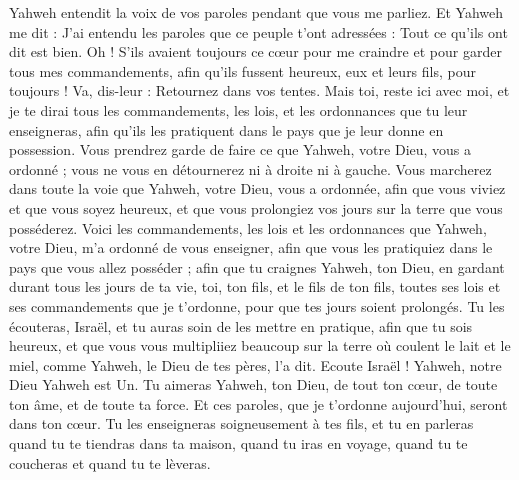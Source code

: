 \begin{multicols}{2}
Yahweh entendit la voix de vos paroles pendant que vous me parliez. Et Yahweh me dit : J'ai entendu les paroles que ce peuple t'ont adressées : Tout ce qu’ils ont dit est bien.
Oh ! S’ils avaient toujours ce cœur pour me craindre et pour garder tous mes commandements, afin qu'ils fussent heureux, eux et leurs fils, pour toujours !
Va, dis-leur : Retournez dans vos tentes.
Mais toi, reste ici avec moi, et je te dirai tous les commandements, les lois, et les ordonnances que tu leur enseigneras, afin qu'ils les pratiquent dans le pays que je leur donne en possession.
Vous prendrez garde de faire ce que Yahweh, votre Dieu, vous a ordonné ; vous ne vous en détournerez ni à droite ni à gauche.
Vous marcherez dans toute la voie que Yahweh, votre Dieu, vous a ordonnée, afin que vous viviez et que vous soyez heureux, et que vous prolongiez vos jours sur la terre que vous posséderez.
\VerseOne{}Voici les commandements, les lois et les ordonnances que Yahweh, votre Dieu, m'a ordonné de vous enseigner, afin que vous les pratiquiez dans le pays que vous allez posséder ;
afin que tu craignes Yahweh, ton Dieu, en gardant durant tous les jours de ta vie, toi, ton fils, et le fils de ton fils, toutes ses lois et ses commandements que je t’ordonne, pour que tes jours soient prolongés.
Tu les écouteras, Israël, et tu auras soin de les mettre en pratique, afin que tu sois heureux, et que vous vous multipliiez beaucoup sur la terre où coulent le lait et le miel, comme Yahweh, le Dieu de tes pères, l'a dit.
Ecoute Israël ! Yahweh, notre Dieu Yahweh est Un.
Tu aimeras Yahweh, ton Dieu, de tout ton cœur, de toute ton âme, et de toute ta force.
Et ces paroles, que je t’ordonne aujourd'hui, seront dans ton cœur.
Tu les enseigneras soigneusement à tes fils, et tu en parleras quand tu te tiendras dans ta maison, quand tu iras en voyage, quand tu te coucheras et quand tu te lèveras.

\end{multicols}
